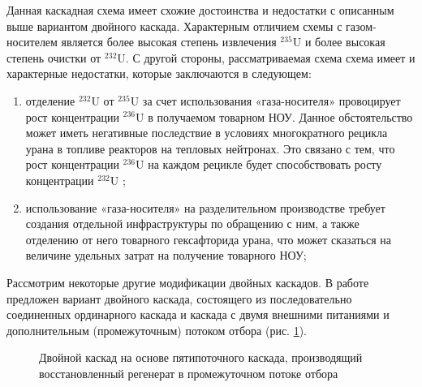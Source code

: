 Данная каскадная схема имеет схожие достоинства и недостатки с описанным выше вариантом двойного каскада. Характерным отличием схемы с газом-носителем является более высокая степень извлечения  $^{235}$U и более высокая степень очистки от $^{232}$U. С другой стороны, рассматриваемая схема схема имеет и характерные недостатки, которые заключаются в следующем:
\begin{enumerate}
  \item	отделение $^{232}$U от $^{235}$U за счет использования «газа-носителя» провоцирует рост концентрации $^{236}$U в получаемом товарном НОУ. Данное обстоятельство может иметь негативные последствие в условиях многократного рецикла урана в топливе реакторов на тепловых нейтронах. Это связано с тем, что рост концентрации $^{236}$U на каждом рецикле будет способствовать росту концентрации $^{232}$U \cite{smirnovEvolutionIsotopicComposition2012};
  \item	использование «газа-носителя» на разделительном производстве требует создания отдельной инфраструктуры по обращению с ним, а также отделению от него товарного гексафторида урана, что может сказаться на величине удельных затрат на получение товарного НОУ;
\end{enumerate}


Рассмотрим некоторые другие модификации двойных каскадов. В работе \cite{SposobIzotopnogoVosstanovleniyac} предложен вариант двойного каскада, состоящего из последовательно соединенных ординарного каскада и каскада с двумя внешними питаниями и дополнительным (промежуточным) потоком отбора (рис. \ref{fig:double_crazy}).

\begin{figure}[ht]
  \caption{Двойной каскад на основе пятипоточного каскада, производящий восстановленный регенерат в промежуточном потоке отбора}\label{fig:double_crazy}
\end{figure}

